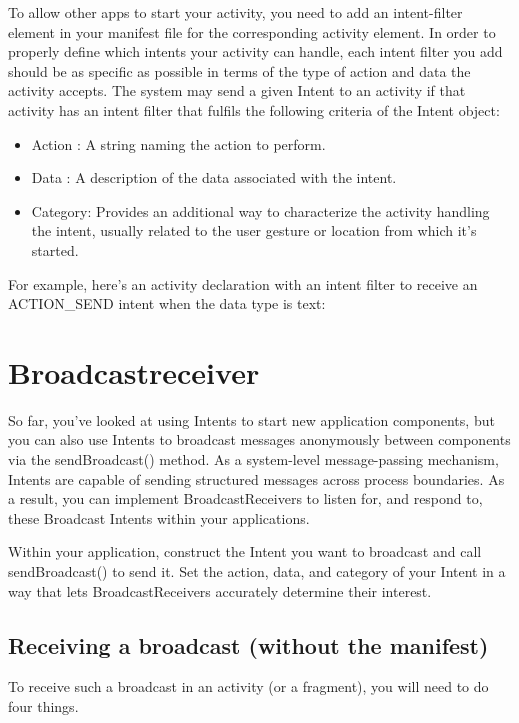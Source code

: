 To allow other apps to start your activity, you need to add an intent-filter element in your manifest file for the corresponding activity element. In order to properly define which intents your activity can handle, each intent filter you add should be as specific as possible in terms of the type of action and data the activity accepts. The system may send a given Intent to an activity if that activity has an intent filter that fulfils the following criteria of the Intent object:

\begin{itemize}
	\item Action : A string naming the action to perform.
	\item Data : A description of the data associated with the intent.
	\item Category: Provides an additional way to characterize the activity handling the intent, usually related to the user gesture or location from which it's started.
\end{itemize}

For example, here's an activity declaration with an intent filter to receive an ACTION\_SEND intent when the data type is text:



\section{Broadcastreceiver}
So far, you’ve looked at using Intents to start new application components, but you can also use Intents to broadcast messages anonymously between components via the sendBroadcast() method. As a system-level message-passing mechanism, Intents are capable of sending structured messages across process boundaries. As a result, you can implement BroadcastReceivers to listen for, and respond to, these Broadcast Intents within your applications.

Within your application, construct the Intent you want to broadcast and call sendBroadcast() to send it. Set the action, data, and category of your Intent in a way that lets BroadcastReceivers accurately determine their interest.

\subsection{Receiving a broadcast (without the manifest)}
To receive such a broadcast in an activity (or a fragment), you will need to do four
things.

